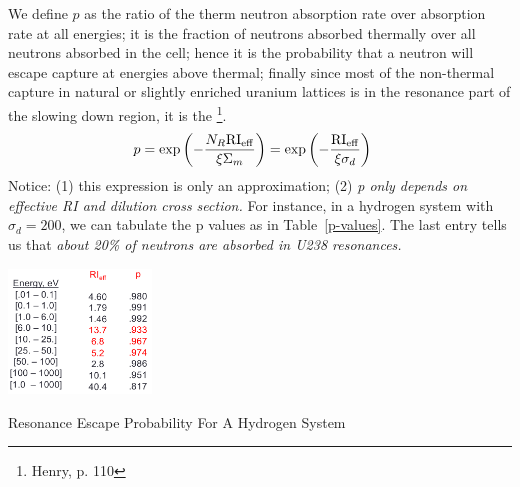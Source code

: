 \documentclass{school-22.211-notes}
\begin{document}
\clearpage
We define $p$ as the ratio of the therm neutron absorption rate over absorption rate at all energies; it is the fraction of neutrons absorbed thermally over all neutrons absorbed in the cell; hence it is the probability that a neutron will escape capture at energies above thermal; finally since most of the non-thermal capture in natural or slightly enriched uranium lattices is in the resonance part of the slowing down region, it is the \footnote{Henry, p. 110}. 
\begin{align}
p &= \exp \left( - \frac{N_R \mathrm{RI}_{\mathrm{eff}}}{\xi \Sigma_m} \right)  = \exp \left( - \frac{\mathrm{RI}_{\mathrm{eff}}}{\xi \sigma_d} \right)
\end{align}
Notice: (1) this expression is only an approximation; (2) \textit{p only depends on effective RI and dilution cross section.} For instance, in a hydrogen system with $\sigma_d = 200$, we can tabulate the p values as in Table~\ref{p-values}. The last entry tells us that \textit{about 20\% of neutrons are absorbed in U238 resonances.}
\begin{table}
  \centering
  \includegraphics[width=1.5in]{images/r-m/resonance-escape-probability.png}
  \caption{Resonance Escape Probability For A Hydrogen System} \label{p-values}
\end{table}
\end{document}
